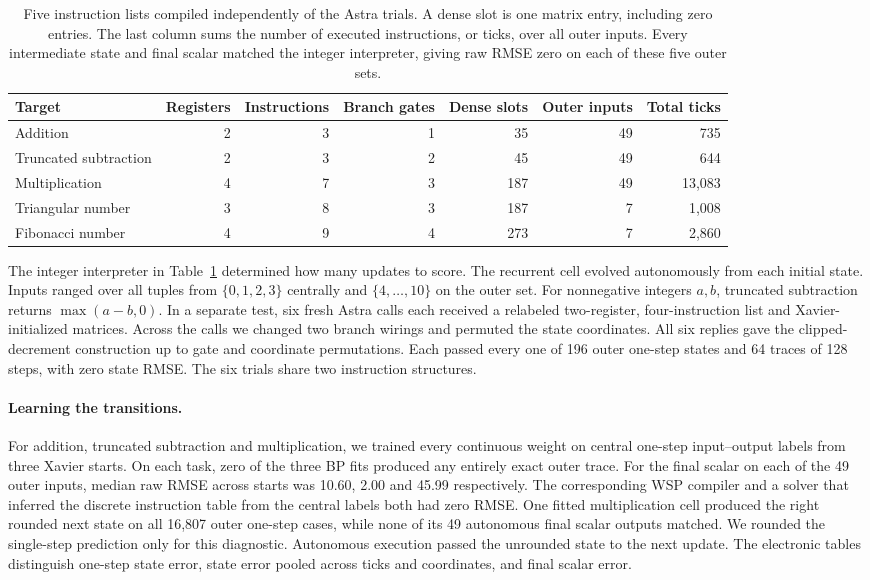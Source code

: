 \begin{table}[htbp]
\centering\small\setlength{\tabcolsep}{4pt}
\caption{Five instruction lists compiled independently of the Astra trials. A dense slot is one matrix entry, including zero entries. The last column sums the number of executed instructions, or ticks, over all outer inputs. Every intermediate state and final scalar matched the integer interpreter, giving raw RMSE zero on each of these five outer sets.}
\label{tab:register-circuits}
\begin{tabular}{@{}lrrrrrr@{}}\toprule
Target & Registers & Instructions & Branch gates & Dense slots & Outer inputs & Total ticks\\\midrule
Addition & 2 & 3 & 1 & 35 & 49 & 735\\
Truncated subtraction & 2 & 3 & 2 & 45 & 49 & 644\\
Multiplication & 4 & 7 & 3 & 187 & 49 & 13,083\\
Triangular number & 3 & 8 & 3 & 187 & 7 & 1,008\\
Fibonacci number & 4 & 9 & 4 & 273 & 7 & 2,860\\\bottomrule
\end{tabular}
\end{table}

The integer interpreter in Table~\ref{tab:register-circuits} determined how many updates to score. The recurrent cell evolved autonomously from each initial state. Inputs ranged over all tuples from $\{0,1,2,3\}$ centrally and $\{4,\ldots,10\}$ on the outer set. For nonnegative integers $a,b$, truncated subtraction returns $\max(a-b,0)$. In a separate test, six fresh Astra calls each received a relabeled two-register, four-instruction list and Xavier-initialized matrices. Across the calls we changed two branch wirings and permuted the state coordinates. All six replies gave the clipped-decrement construction up to gate and coordinate permutations. Each passed every one of 196 outer one-step states and 64 traces of 128 steps, with zero state RMSE. The six trials share two instruction structures.

\paragraph{Learning the transitions.}
For addition, truncated subtraction and multiplication, we trained every continuous weight on central one-step input--output labels from three Xavier starts. On each task, zero of the three BP fits produced any entirely exact outer trace. For the final scalar on each of the 49 outer inputs, median raw RMSE across starts was 10.60, 2.00 and 45.99 respectively. The corresponding WSP compiler and a solver that inferred the discrete instruction table from the central labels both had zero RMSE. One fitted multiplication cell produced the right rounded next state on all 16,807 outer one-step cases, while none of its 49 autonomous final scalar outputs matched. We rounded the single-step prediction only for this diagnostic. Autonomous execution passed the unrounded state to the next update. The electronic tables distinguish one-step state error, state error pooled across ticks and coordinates, and final scalar error.
